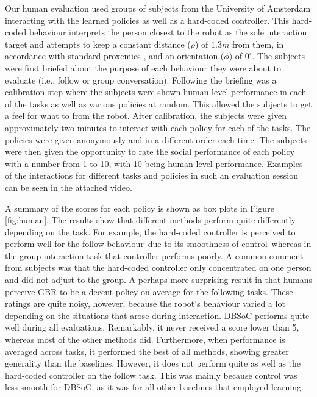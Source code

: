 \documentclass[letterpaper, 10 pt, conference]{ieeeconf}
\begin{document}
Our human evaluation used groups of subjects from the University of Amsterdam interacting with the learned policies as well as a hard-coded controller. This hard-coded behaviour interprets the person closest to the robot as the sole interaction target and attempts to keep a constant distance ($\rho$) of $1.3m$ from them, in accordance with standard proxemics \cite{hall1966hidden}, and an orientation ($\phi$) of $0^\circ$. The subjects were first briefed about the purpose of each behaviour they were about to evaluate (i.e., follow or group conversation). Following the briefing was a calibration step where the subjects were shown human-level performance in each of the tasks as well as various policies at random. This allowed the subjects to get a feel for what to from the robot. After calibration, the subjects were given approximately two minutes to interact with each policy for each of the tasks. The policies were given anonymously and in a different order each time. The subjects were then given the opportunity to rate the social performance of each policy with a number from 1 to 10, with 10 being human-level performance. Examples of the interactions for different tasks and policies in such an evaluation session can be seen in the attached video.

A summary of the scores for each policy is shown as box plots in Figure \ref{fig:human}. The results show that different methods perform quite differently depending on the task. For example, the hard-coded controller is perceived to perform  well for the follow behaviour--due to its smoothness of control--whereas in the group interaction task that controller performs poorly. A common comment from subjects was that the hard-coded controller only concentrated on one person and did not adjust to the group. A perhaps more surprising result in that humans perceive GBR to be a decent policy on average for the following tasks. These ratings are quite noisy, however, because the robot's behaviour varied a lot depending on the situations that arose during interaction. DBSoC performs quite well during all evaluations. Remarkably, it never received a score lower than 5, whereas most of the other methods did.  Furthermore, when performance is averaged across tasks, it performed the best of all methods, showing greater generality than the baselines.  However, it does not perform quite as well as the hard-coded controller on the follow task. This was mainly because control was less smooth for DBSoC, as it was for all other baselines that employed learning.
\end{document}
